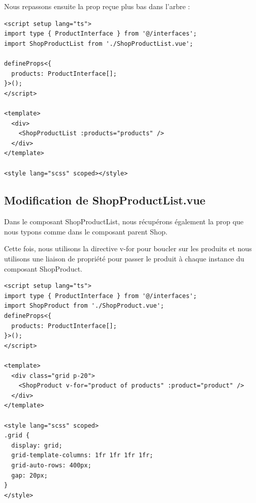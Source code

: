 Nous repassons ensuite la {\color{monOrange}prop} reçue plus bas dans l'arbre :
\begin{verbatim}
<script setup lang="ts">
import type { ProductInterface } from '@/interfaces';
import ShopProductList from './ShopProductList.vue';

defineProps<{
  products: ProductInterface[];
}>();
</script>

<template>
  <div>
    <ShopProductList :products="products" />
  </div>
</template>

<style lang="scss" scoped></style>
\end{verbatim}
\subsection{Modification de {\color{monOrange}ShopProductList.vue}}
Dans le composant {\color{monOrange}ShopProductList}, nous récupérons également la {\color{monOrange}prop} que nous typons comme dans le composant parent {\color{monOrange}Shop}.

Cette fois, nous utilisons la directive {\color{monOrange}v-for} pour boucler sur les produits et nous utilisons une liaison de propriété pour passer le produit à chaque instance du composant {\color{monOrange}ShopProduct}.
\begin{verbatim}
<script setup lang="ts">
import type { ProductInterface } from '@/interfaces';
import ShopProduct from './ShopProduct.vue';
defineProps<{
  products: ProductInterface[];
}>();
</script>

<template>
  <div class="grid p-20">
    <ShopProduct v-for="product of products" :product="product" />
  </div>
</template>

<style lang="scss" scoped>
.grid {
  display: grid;
  grid-template-columns: 1fr 1fr 1fr 1fr;
  grid-auto-rows: 400px;
  gap: 20px;
}
</style>
\end{verbatim}
